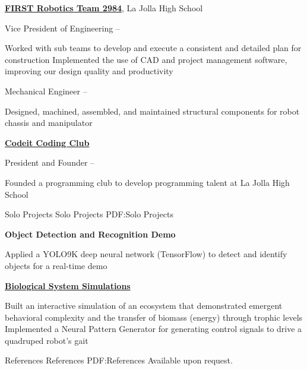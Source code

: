 \documentclass[letterpaper,MMMyyyy,nonstopmode]{simpleresumecv}
\begin{document}
\begin{Body}
\BigGap
\Entry
\href{https://frcteam2984.github.io/}
{\textbf{FIRST Robotics Team 2984}},
La Jolla High School

\Gap
\BulletItem
Vice President of Engineering
\hfill
{} --
\begin{Detail}
\SubBulletItem
Worked with sub teams to develop and execute a consistent and detailed plan for construction
\SubBulletItem
Implemented the use of CAD and project management software, improving our design quality and productivity
\end{Detail}

\Gap
\BulletItem
Mechanical Engineer
\hfill
{} --
\begin{Detail}
\SubBulletItem
Designed, machined, assembled, and maintained structural components for robot chassis and manipulator
\end{Detail}


\BigGap
\Entry
\href{http://}
{\textbf{Codeit Coding Club}}

\Gap
\BulletItem
President and Founder
\hfill
{} --
\begin{Detail}
\SubBulletItem
Founded a programming club to develop programming talent at La Jolla High School
\end{Detail}



\Section
{Solo Projects}
{Solo Projects}
{PDF:Solo Projects}

\Entry
\textbf{Object Detection and Recognition Demo}
\hfill
{}
\Gap
\begin{Detail}
\SubBulletItem
Applied a YOLO9K deep neural network (TensorFlow) to detect and identify objects for a real-time demo 
\end{Detail}

\BigGap
\BigGap
\Entry
\href{http://axquaris.github.io/}
{\textbf{Biological System Simulations}}
\hfill

\Gap
\begin{Detail}
\SubBulletItem
Built an interactive simulation of an ecosystem that demonstrated emergent behavioral complexity and the transfer of biomass (energy) through trophic levels
\SubBulletItem
Implemented a Neural Pattern Generator for generating control signals to drive a quadruped robot's gait
\end{Detail}

\Section
{References}
{References}
{PDF:References}
\Entry
Available upon request.

\end{Body}
\thispagestyle{empty} %
\end{document}

